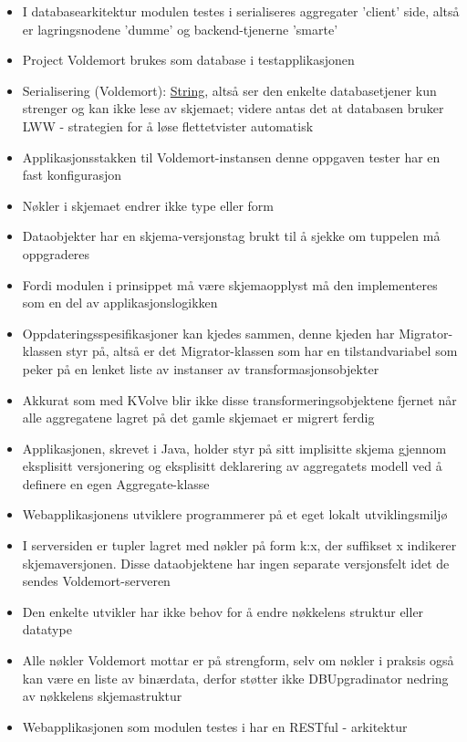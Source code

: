 \begin{itemize}
  \item I databasearkitektur modulen testes i serialiseres aggregater 'client' side, altså er lagringsnodene 'dumme' og backend-tjenerne 'smarte'
  \item Project Voldemort brukes som database i testapplikasjonen
  \item Serialisering (Voldemort): \underline{String}, altså ser den enkelte databasetjener kun strenger og kan ikke lese av skjemaet; videre antas det at databasen bruker LWW - strategien for å løse flettetvister automatisk
  \item Applikasjonsstakken til Voldemort-instansen denne oppgaven tester har en fast konfigurasjon
  \item Nøkler i skjemaet endrer ikke type eller form
  \item Dataobjekter har en skjema-versjonstag brukt til å sjekke om tuppelen må oppgraderes
  \item Fordi modulen i prinsippet må være skjemaopplyst må den implementeres som en del av applikasjonslogikken
  \item Oppdateringsspesifikasjoner kan kjedes sammen, denne kjeden har Migrator-klassen styr på, altså er det Migrator-klassen som har en tilstandvariabel som peker på en lenket liste av instanser av transformasjonsobjekter
  \item Akkurat som med KVolve blir ikke disse transformeringsobjektene fjernet når alle aggregatene lagret på det gamle skjemaet er migrert ferdig
  \item Applikasjonen, skrevet i Java, holder styr på sitt implisitte skjema gjennom eksplisitt versjonering og eksplisitt deklarering av aggregatets modell ved å definere en egen Aggregate-klasse
  \item Webapplikasjonens utviklere programmerer på et eget lokalt utviklingsmiljø
  \item I serversiden er tupler lagret med nøkler på form k:x, der suffikset x indikerer skjemaversjonen. Disse dataobjektene har ingen separate versjonsfelt idet de sendes Voldemort-serveren
  \item Den enkelte utvikler har ikke behov for å endre nøkkelens struktur eller datatype
  \item Alle nøkler Voldemort mottar er på strengform, selv om nøkler i praksis også kan være en liste av binærdata, derfor støtter ikke DBUpgradinator nedring av nøkkelens skjemastruktur
  \item Webapplikasjonen som modulen testes i har en RESTful - arkitektur

\end{itemize}
